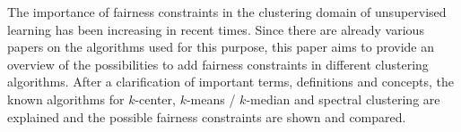 The importance of fairness constraints in the clustering domain of unsupervised learning has been increasing in recent times. Since there are already various papers on the algorithms used for this purpose, this paper aims to provide an overview of the possibilities to add fairness constraints in different clustering algorithms. After a clarification of important terms, definitions and concepts, the known algorithms for $k$-center, $k$-means / $k$-median and spectral clustering are explained and the possible fairness constraints are shown and compared.